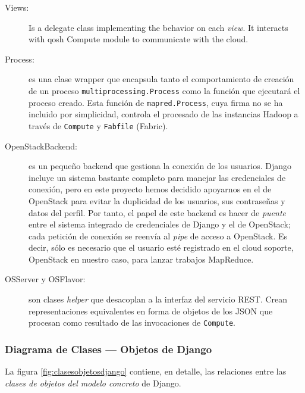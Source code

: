 \begin{description}
 \item[Views:] Is a delegate class implementing the behavior on each \emph{view}. It interacts with qosh Compute module to communicate with the cloud.
 \item[Process:] es una clase wrapper que encapsula tanto el comportamiento de creaci\'on de un proceso \texttt{multiprocessing.Process} como la funci\'on que ejecutar\'a el proceso creado. Esta funci\'on de \texttt{mapred.Process}, cuya firma no se ha incluido por simplicidad, controla el procesado de las instancias Hadoop a trav\'es de \texttt{Compute} y \texttt{Fabfile} (Fabric).
 \item[OpenStackBackend:] es un peque\~no backend que gestiona la conexi\'on de los usuarios. Django incluye un sistema bastante completo para manejar las credenciales de conexi\'on, pero en este proyecto hemos decidido apoyarnos en el de OpenStack para evitar la duplicidad de los usuarios, sus contrase\~nas y datos del perfil. Por tanto, el papel de este backend es hacer de \emph{puente} entre el sistema integrado de credenciales de Django y el de OpenStack; cada petici\'on de conexi\'on se reenv\'ia al \emph{pipe} de acceso a OpenStack. Es decir, s\'olo es necesario que el usuario est\'e registrado en el cloud soporte, OpenStack en nuestro caso, para lanzar trabajos MapReduce.
 \item[OSServer y OSFlavor:] son clases \emph{helper} que desacoplan a la interfaz del servicio REST. Crean representaciones equivalentes en forma de objetos de los JSON que procesan como resultado de las invocaciones de \texttt{Compute}.
\end{description}



\subsubsection{Diagrama de Clases --- Objetos de Django}\label{subsubsec:clasesobjetosdjango}
\noindent La figura \ref{fig:clasesobjetosdjango} contiene, en detalle, las relaciones entre las \emph{clases de objetos del modelo concreto} de Django.


